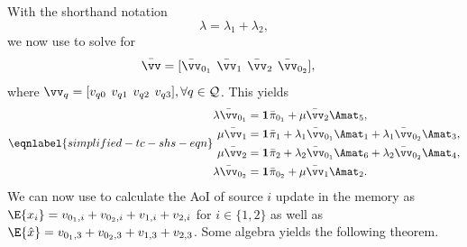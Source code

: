 \documentclass[conference, 10pt]{IEEEtran}
\newcommand{\Qcal}{\mathcal{Q}}
\newcommand{\rowvec}[1]{[\begin{matrix} #1\end{matrix}]}
\newcommand{\rvec}[1]{\smrvec{#1}}
\newcommand{\smrvec}[1]{\setlength\arraycolsep{2pt}\rowvec{#1}}
\newcommand{\piv}{\text{\boldmath{$\pi$}}}
\newcommand{\pibar}{\bar{\pi}}
\newcommand{\vvbar}{\bar{\vv}}
\newcommand{\onev}[1][n]{{\mathbf{1}}_{#1}}
\newcommand{\lam}{\lambda}
\newcommand{\RY}[1]{\quad {\color{red} #1} \quad}
\begin{document}
With the shorthand notation 
\begin{equation}
    \lam=\lam_1+\lam_2,
    \end{equation}
we now use  to solve for
\begin{align}
    \vvbar &= \rvec{\vvbar_{0_1}&\vvbar_{1}&\vvbar_{2}&\vvbar_{0_2}},
\end{align}
where 
$\vv_q=\rvec{v_{q0}&v_{q1}&v_{q2}&v_{q3}}, \forall q \in \Qcal$. 
This yields
\begin{subequations}
\eqnlabel{simplified-tc-shs-eqn}
\begin{align}
\lam \vvbar_{0_1} &= \onev[]\pibar_{0_1} + \mu \vvbar_2 \Amat_5, \\
\mu\vvbar_1 &= \onev[]\pibar_1 + \lam_1 \vvbar_{0_1} \Amat_1 + \lam_1 \vvbar_{0_2} \Amat_3, \\
\mu\vvbar_2 &= \onev[]\pibar_2 + \lam_2 \vvbar_{0_1} \Amat_6 + \lam_2 \vvbar_{0_2} \Amat_4, \\
\lam \vvbar_{0_2} &= \onev[]\pibar_{0_2} + \mu \vvbar_1 \Amat_2.
\end{align}
\end{subequations}
We can now use  to calculate the AoI of source $i$ update in the memory as $\E{x_i} = v_{0_1, i} + v_{0_2, i} + v_{1, i} + v_{2, i}$ for $i \in \{1, 2 \}$ as well as $\E{\hat{x}}= v_{0_1, 3} + v_{0_2, 3} + v_{1, 3} + v_{2, 3}$. 
Some
algebra
yields the following theorem.
\end{document}
